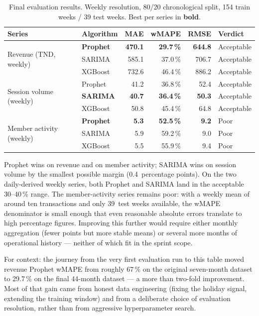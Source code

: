 \begin{table}[H]
  \centering
  \caption{Final evaluation results. Weekly resolution, 80/20 chronological
           split, 154 train weeks / 39 test weeks. Best per series in
           \textbf{bold}.\label{tab:forecast_comparison_final}}
  \begin{tabular}{llrrrl}
    \toprule
    \textbf{Series} & \textbf{Algorithm} & \textbf{MAE} & \textbf{wMAPE} &
    \textbf{RMSE} & \textbf{Verdict} \\
    \midrule
    \multirow{3}{*}{Revenue (TND, weekly)}
      & \textbf{Prophet} & \textbf{470.1} & \textbf{29.7\,\%} & \textbf{644.8} & Acceptable \\
      & SARIMA  & 585.1 & 37.0\,\% & 706.7 & Acceptable \\
      & XGBoost & 732.6 & 46.4\,\% & 886.2 & Acceptable \\
    \midrule
    \multirow{3}{*}{Session volume (weekly)}
      & Prophet & 41.2 & 36.8\,\% & 52.4 & Acceptable \\
      & \textbf{SARIMA}  & \textbf{40.7} & \textbf{36.4\,\%} & \textbf{50.3} & Acceptable \\
      & XGBoost & 50.8 & 45.4\,\% & 64.8 & Acceptable \\
    \midrule
    \multirow{3}{*}{Member activity (weekly)}
      & \textbf{Prophet} & \textbf{5.3} & \textbf{52.5\,\%} & \textbf{9.2} & Poor \\
      & SARIMA  & 5.9 & 59.2\,\% & 9.0 & Poor \\
      & XGBoost & 5.5 & 55.9\,\% & 9.4 & Poor \\
    \bottomrule
  \end{tabular}
\end{table}

Prophet wins on revenue and on member activity; SARIMA wins on session
volume by the smallest possible margin (0.4~percentage points). On the two
daily-derived weekly series, both Prophet and SARIMA land in the acceptable
30--40\,\% range. The member-activity series remains poor: with a weekly
mean of around ten transactions and only 39~test weeks available, the
wMAPE denominator is small enough that even reasonable absolute errors
translate to high percentage figures. Improving this further would require
either monthly aggregation (fewer points but more stable means) or several
more months of operational history --- neither of which fit in the sprint
scope.

For context: the journey from the very first evaluation run to this table
moved revenue Prophet wMAPE from roughly 67\,\% on the original seven-month
dataset to 29.7\,\% on the final 44-month dataset --- a more than two-fold
improvement. Most of that gain came from honest data engineering (fixing the
holiday signal, extending the training window) and from a deliberate choice
of evaluation resolution, rather than from aggressive hyperparameter search.

